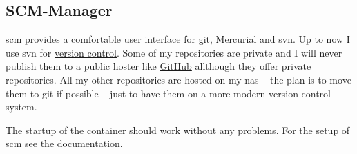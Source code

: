 

\subsection{SCM-Manager}

\gls{scm} provides a comfortable user interface for \gls{git},
\href{https://www.mercurial-scm.org}{Mercurial} and \gls{svn}. Up to now I use
\gls{svn} for \href{https://en.wikipedia.org/wiki/Version_control}{version control}.
Some of my repositories are private and I will never publish them to a public
hoster like \href{https://github.com}{GitHub} allthough they offer private
repositories. All my other repositories are hosted on my \gls{nas} -- the plan
is to move them to \gls{git} if possible -- just to have them on a more modern
version control system.
\bigbreak


The startup of the container should work without any problems. For the setup
of \gls{scm} see the \href{https://scm-manager.org/docs/latest/en/}{documentation}.

